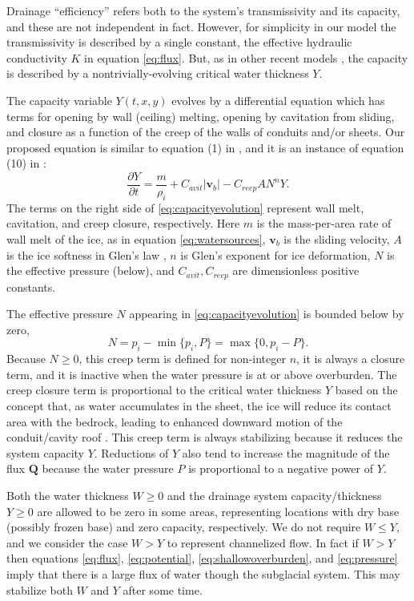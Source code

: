 \documentclass[11pt]{amsart}
\newcommand{\bQ}{\mathbf{Q}}
\newcommand{\bv}{\mathbf{v}}
\newcommand{\Cavit}{C_{avit}}
\newcommand{\Creep}{C_{reep}}
\begin{document}
Drainage ``efficiency'' refers both to the system's transmissivity and its capacity, and these are not independent in fact.  However, for simplicity in our model the transmissivity is described by a single constant, the effective hydraulic conductivity $K$ in equation \eqref{eq:flux}.  But, as in other recent models \citep{CreytsSchoof2009,Hewitt2011}, the capacity is described by a nontrivially-evolving critical water thickness $Y$.

The capacity variable $Y(t,x,y)$ evolves by a differential equation which has terms for opening by wall (ceiling) melting, opening by cavitation from sliding, and closure as a function of the creep of the walls of conduits and/or sheets.  Our proposed equation is similar to equation (1) in \citet{Schoofmeltsupply}, and it is an instance of equation (10) in \citet{Hewitt2011}:
\begin{equation} \label{eq:capacityevolution}
\frac{\partial Y}{\partial t} = \frac{m}{\rho_i} + \Cavit |\bv_b| - \Creep A N^n Y.
\end{equation}
The terms on the right side of \eqref{eq:capacityevolution} represent wall melt, cavitation, and creep closure, respectively.  Here $m$ is the mass-per-area rate of wall melt of the ice, as in equation \eqref{eq:watersources}, $\bv_b$ is the sliding velocity, $A$ is the ice softness in Glen's law \citep{Paterson}, $n$ is Glen's exponent for ice deformation, $N$ is the effective pressure (below), and $\Cavit,\Creep$ are dimensionless positive constants.

The effective pressure $N$ appearing in \eqref{eq:capacityevolution} is bounded below by zero,
\begin{equation} \label{eq:effectivepressure}
N = p_i - \min\{p_i,P\} = \max\{0,p_i-P\}.
\end{equation}
Because $N\ge 0$, this creep term is defined for non-integer $n$, it is always a closure term, and it is inactive when the water pressure is at or above overburden.  The creep closure term is proportional to the critical water thickness $Y$ based on the concept that, as water accumulates in the sheet, the ice will reduce its contact area with the bedrock, leading to enhanced downward motion of the conduit/cavity roof \citep{Hewitt2011}.  This creep term is always stabilizing because it reduces the system capacity $Y$.  Reductions of $Y$ also tend to increase the magnitude of the flux $\bQ$ because the water pressure $P$ is proportional to a negative power of $Y$.

Both the water thickness $W \ge 0$ and the drainage system capacity/thickness $Y \ge 0$ are allowed to be zero in some areas, representing locations with dry base (possibly frozen base) and zero capacity, respectively.  We do not require $W\le Y$, and we consider the case $W>Y$ to represent channelized flow.  In fact if $W>Y$ then equations \eqref{eq:flux}, \eqref{eq:potential}, \eqref{eq:shallowoverburden}, and \eqref{eq:pressure} imply that there is a large flux of water though the subglacial system.  This may stabilize both $W$ and $Y$ after some time.
\end{document}
